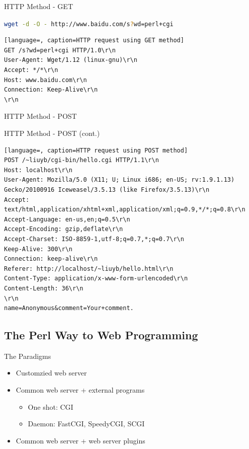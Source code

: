 \documentclass{beamer}
\begin{document}
\begin{frame}[containsverbatim]{HTTP Method - GET}
  \begin{center}
    \lstinline[language=bash]{wget -d -O - http://www.baidu.com/s?wd=perl+cgi}
  \end{center}
  \begin{lstlisting}[language=, caption=HTTP request using GET method]
GET /s?wd=perl+cgi HTTP/1.0\r\n
User-Agent: Wget/1.12 (linux-gnu)\r\n
Accept: */*\r\n
Host: www.baidu.com\r\n
Connection: Keep-Alive\r\n
\r\n
  \end{lstlisting}
\end{frame}

\begin{frame}[containsverbatim]{HTTP Method - POST}
 
\end{frame}

\begin{frame}[containsverbatim]{HTTP Method - POST (cont.)}
  \begin{lstlisting}[language=, caption=HTTP request using POST method]
POST /~liuyb/cgi-bin/hello.cgi HTTP/1.1\r\n
Host: localhost\r\n
User-Agent: Mozilla/5.0 (X11; U; Linux i686; en-US; rv:1.9.1.13) Gecko/20100916 Iceweasel/3.5.13 (like Firefox/3.5.13)\r\n
Accept: text/html,application/xhtml+xml,application/xml;q=0.9,*/*;q=0.8\r\n
Accept-Language: en-us,en;q=0.5\r\n
Accept-Encoding: gzip,deflate\r\n
Accept-Charset: ISO-8859-1,utf-8;q=0.7,*;q=0.7\r\n
Keep-Alive: 300\r\n
Connection: keep-alive\r\n
Referer: http://localhost/~liuyb/hello.html\r\n
Content-Type: application/x-www-form-urlencoded\r\n
Content-Length: 36\r\n
\r\n
name=Anonymous&comment=Your+comment.
  \end{lstlisting}
\end{frame}

\subsection{The Perl Way to Web Programming}

\begin{frame}{The Paradigms}
  \begin{itemize}
    \item Customzied web server
    \item Common web server + external programs
        \begin{itemize}
            \item One shot: CGI
            \item Daemon: FastCGI, SpeedyCGI, SCGI
        \end{itemize}
    \item Common web server + web server plugins
  \end{itemize}
\end{frame}
\end{document}
